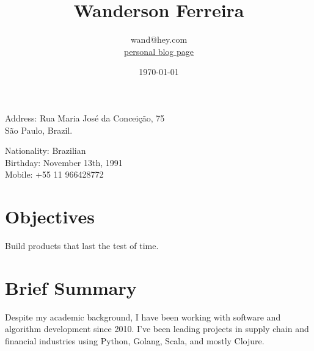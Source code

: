 \documentclass[10pt]{article}
\title{\bfseries\Huge Wanderson Ferreira}
\author{wand@hey.com \\
\href{https://world.hey.com/wand}{personal blog page}}
\date{\today}
\begin{document}
\maketitle

\begin{center}
  \begin{minipage}{.7\textwidth}
    Address: Rua Maria José da Conceição, 75\\
    São Paulo, Brazil.
  \end{minipage}%
  \begin{minipage}{.5\textwidth}
    Nationality: Brazilian\\
    Birthday: November 13th, 1991\\
    Mobile: +55 11 966428772
  \end{minipage}
\end{center}

\section*{Objectives}
Build products that last the test of time.


\section*{Brief Summary}

Despite my academic background, I have been working with software and
algorithm development since 2010. I've been leading projects in supply
chain and financial industries using Python, Golang, Scala, and mostly
Clojure.
\end{document}
